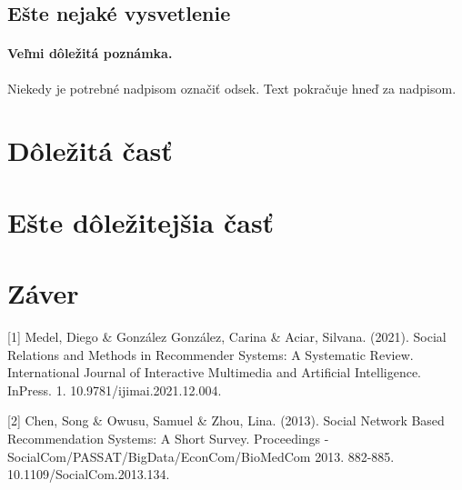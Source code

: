 \documentclass[10pt,twoside,slovak,a4paper]{article}
\begin{document}
\subsection{Ešte nejaké vysvetlenie} \label{ina:este}

\paragraph{Veľmi dôležitá poznámka.}
Niekedy je potrebné nadpisom označiť odsek. Text pokračuje hneď za nadpisom.



\section{Dôležitá časť} \label{dolezita}




\section{Ešte dôležitejšia časť} \label{dolezitejsia}




\section{Záver} \label{zaver} %







[1] Medel, Diego & González González, Carina & Aciar, Silvana. (2021). Social Relations and Methods in Recommender Systems: A Systematic Review. International Journal of Interactive Multimedia and Artificial Intelligence. InPress. 1. 10.9781/ijimai.2021.12.004.

[2] Chen, Song & Owusu, Samuel & Zhou, Lina. (2013). Social Network Based Recommendation Systems: A Short Survey. Proceedings - SocialCom/PASSAT/BigData/EconCom/BioMedCom 2013. 882-885. 10.1109/SocialCom.2013.134.

\end{document}
